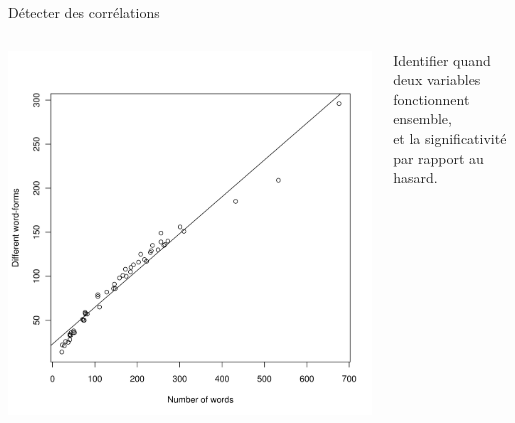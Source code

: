 \documentclass[ignorenonframetext]{beamer}
\begin{document}
\begin{frame}{Détecter des corrélations}

\begin{columns}
	\begin{column}{0.45\textwidth}
		\includegraphics[width=\textwidth]{img/Regression_lineaire_richLex.jpg}
	\end{column}
	\begin{column}{0.45\textwidth}
		Identifier quand deux variables \alert{fonctionnent ensemble},\\
		et la \alert{significativité} par rapport au hasard.
		
	\end{column}
\end{columns}
\end{frame}
\end{document}
